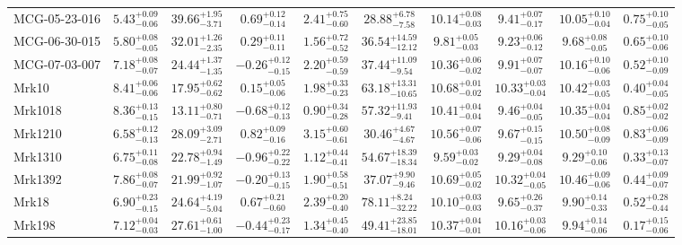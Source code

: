 \documentclass[onecolumn]{mn2e}
\begin{document}
\begin{landscape}
{\begin{center}
\begin{longtable}{lccccccccc}
MCG-05-23-016 & $5.43_{-0.06}^{+0.09}$ & $39.66_{-3.71}^{+1.95}$ & $0.69_{-0.14}^{+0.12}$ & $2.41_{-0.60}^{+0.75}$ &$28.88_{-7.58}^{+6.78}$ & $10.14_{-0.03}^{+0.08}$ & $9.41_{-0.17}^{+0.07}$ & $10.05_{-0.04}^{+0.10}$ & $0.75_{-0.05}^{+0.10}$ \\
MCG-06-30-015 & $5.80_{-0.05}^{+0.08}$ & $32.01_{-2.35}^{+1.26}$ & $0.29_{-0.11}^{+0.11}$ & $1.56_{-0.52}^{+0.72}$ &$36.54_{-12.12}^{+14.59}$ & $9.81_{-0.03}^{+0.05}$ & $9.23_{-0.12}^{+0.06}$ & $9.68_{-0.05}^{+0.08}$ & $0.65_{-0.06}^{+0.10}$ \\
MCG-07-03-007 & $7.18_{-0.07}^{+0.08}$ & $24.44_{-1.35}^{+1.37}$ & $-0.26_{-0.15}^{+0.12}$ & $2.20_{-0.59}^{+0.59}$ &$37.44_{-9.54}^{+11.09}$ & $10.36_{-0.02}^{+0.06}$ & $9.91_{-0.07}^{+0.07}$ & $10.16_{-0.06}^{+0.10}$ & $0.52_{-0.09}^{+0.10}$ \\
Mrk10 & $8.41_{-0.06}^{+0.06}$ & $17.95_{-0.62}^{+0.62}$ & $0.15_{-0.06}^{+0.05}$ & $1.98_{-0.23}^{+0.33}$ &$63.18_{-10.65}^{+13.31}$ & $10.68_{-0.02}^{+0.01}$ & $10.33_{-0.04}^{+0.03}$ & $10.42_{-0.05}^{+0.03}$ & $0.40_{-0.05}^{+0.04}$ \\
Mrk1018 & $8.36_{-0.15}^{+0.13}$ & $13.11_{-0.71}^{+0.80}$ & $-0.68_{-0.13}^{+0.12}$ & $0.90_{-0.28}^{+0.34}$ &$57.32_{-9.41}^{+11.93}$ & $10.41_{-0.04}^{+0.04}$ & $9.46_{-0.05}^{+0.04}$ & $10.35_{-0.04}^{+0.04}$ & $0.85_{-0.02}^{+0.02}$ \\
Mrk1210 & $6.58_{-0.13}^{+0.12}$ & $28.09_{-2.71}^{+3.09}$ & $0.82_{-0.16}^{+0.09}$ & $3.15_{-0.61}^{+0.60}$ &$30.46_{-4.67}^{+4.67}$ & $10.56_{-0.06}^{+0.07}$ & $9.67_{-0.15}^{+0.15}$ & $10.50_{-0.09}^{+0.08}$ & $0.83_{-0.09}^{+0.06}$ \\
Mrk1310 & $6.75_{-0.08}^{+0.11}$ & $22.78_{-1.49}^{+0.94}$ & $-0.96_{-0.22}^{+0.22}$ & $1.12_{-0.41}^{+0.44}$ &$54.67_{-18.34}^{+18.39}$ & $9.59_{-0.02}^{+0.03}$ & $9.29_{-0.08}^{+0.04}$ & $9.29_{-0.06}^{+0.10}$ & $0.33_{-0.07}^{+0.13}$ \\
Mrk1392 & $7.86_{-0.07}^{+0.08}$ & $21.99_{-1.07}^{+0.92}$ & $-0.20_{-0.15}^{+0.13}$ & $1.90_{-0.51}^{+0.58}$ &$37.07_{-9.46}^{+9.90}$ & $10.69_{-0.02}^{+0.05}$ & $10.32_{-0.05}^{+0.04}$ & $10.46_{-0.06}^{+0.09}$ & $0.44_{-0.07}^{+0.09}$ \\
Mrk18 & $6.90_{-0.15}^{+0.23}$ & $24.64_{-5.04}^{+4.19}$ & $0.67_{-0.60}^{+0.21}$ & $2.39_{-0.40}^{+0.20}$ &$78.11_{-32.22}^{+8.24}$ & $10.10_{-0.03}^{+0.03}$ & $9.65_{-0.37}^{+0.26}$ & $9.90_{-0.33}^{+0.14}$ & $0.52_{-0.44}^{+0.28}$ \\
Mrk198 & $7.12_{-0.03}^{+0.04}$ & $27.61_{-1.00}^{+0.61}$ & $-0.44_{-0.17}^{+0.23}$ & $1.34_{-0.40}^{+0.45}$ &$49.41_{-18.01}^{+23.85}$ & $10.37_{-0.01}^{+0.04}$ & $10.16_{-0.06}^{+0.03}$ & $9.94_{-0.06}^{+0.14}$ & $0.17_{-0.06}^{+0.15}$ \\

\end{longtable}
\end{center}}
\end{landscape}
\end{document}
